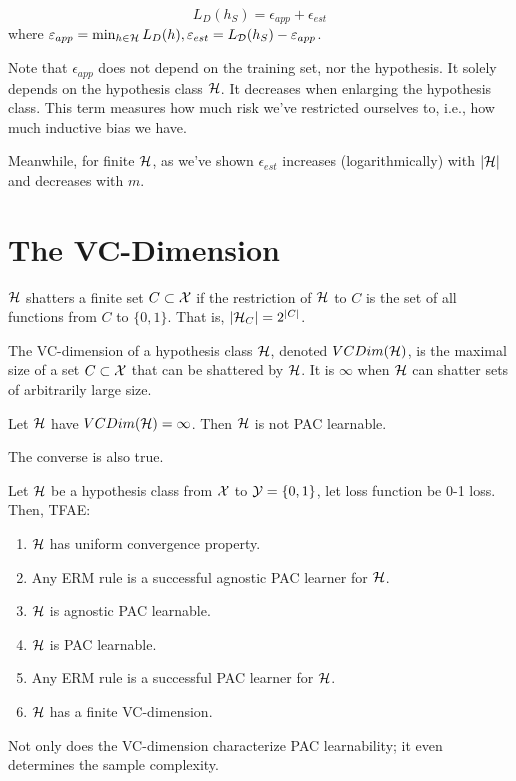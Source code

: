 \documentclass[a4paper, 10pt]{article}
\begin{document}
    \begin{definition} 
    \begin{equation*}
    L_D(h_S) = \epsilon_{app} + \epsilon_{est}
    \end{equation*}
    where $\varepsilon_{app} = \min_{h \in \mathcal{H}}L_D(h), \varepsilon_{est} = L_{\mathcal{D}}(h_S) - \varepsilon_{app}$.
    \end{definition}

    Note that $\epsilon_{app}$ does not depend on the training set, nor the hypothesis. It solely depends on the hypothesis class $\mathcal{H}$. It decreases when enlarging the hypothesis class. This term measures how much risk we've restricted ourselves to, i.e., how much inductive bias we have.

    Meanwhile, for finite $\mathcal{H}$, as we've shown $\epsilon_{est}$ increases (logarithmically) with $\lvert\mathcal{H}\rvert$ and decreases with $m$.
   \section{The VC-Dimension}
    \begin{definition} [Shattering]
    $\mathcal{H}$ shatters a finite set $C \subset \mathcal{X}$ if the restriction of $\mathcal{H}$ to $C$ is the set of all functions from $C$ to $\{0, 1\}$. That is, $\lvert\mathcal{H}_C\rvert = 2^{\lvert C\rvert}$.
    \end{definition}

    \begin{definition} [VC-dimension]
    The VC-dimension of a hypothesis class $\mathcal{H}$, denoted $VCDim(\mathcal{H})$, is the maximal size of a set $C \subset \mathcal{X}$ that can be shattered by $\mathcal{H}$. It is $\infty$ when $\mathcal{H}$ can shatter sets of arbitrarily large size.
    \end{definition}

    \begin{theorem}
    Let $\mathcal{H}$ have $VCDim(\mathcal{H}) = \infty$. Then $\mathcal{H}$ is not PAC learnable.
    \end{theorem}

    The converse is also true.
    \begin{theorem} 
        Let $\mathcal{H}$ be a hypothesis class from $\mathcal{X}$ to $\mathcal{Y} = \{0, 1\}$, let loss function be 0-1 loss. Then, TFAE:
        \begin{enumerate}
        \item $\mathcal{H}$ has uniform convergence property.
        \item Any ERM rule is a successful agnostic PAC learner for $\mathcal{H}$.
        \item $\mathcal{H}$ is agnostic PAC learnable.
        \item $\mathcal{H}$ is PAC learnable.
        \item Any ERM rule is a successful PAC learner for $\mathcal{H}$.
        \item $\mathcal{H}$ has a finite VC-dimension.
        \end{enumerate}

    Not only does the VC-dimension characterize PAC learnability; it even determines the sample complexity.
    \end{theorem}
\end{document}
